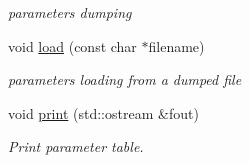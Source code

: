\begin{DoxyCompactItemize}
\begin{DoxyCompactList}\small\item\em parameters dumping \end{DoxyCompactList}\item 
void \hyperlink{classARC_1_1chainpars_a881b1143fd8935bbfb454a769c485f63}{load} (const char $\ast$filename)
\begin{DoxyCompactList}\small\item\em parameters loading from a dumped file \end{DoxyCompactList}\item 
void \hyperlink{classARC_1_1chainpars_a69e926aea002e117e14bb8122537c329}{print} (std\+::ostream \&fout)
\begin{DoxyCompactList}\small\item\em Print parameter table. \end{DoxyCompactList}\end{DoxyCompactItemize}
